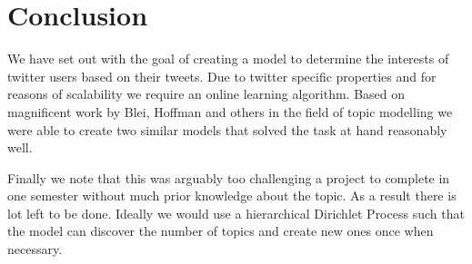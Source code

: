 \section{Conclusion}
We have set out with the goal of creating a model to determine the interests of twitter users based on their tweets. Due to twitter specific properties and for reasons of scalability we require an online learning algorithm. Based on magnificent work by Blei, Hoffman and others in the field of topic modelling we were able to create two similar models that solved the task at hand reasonably well.

Finally we note that this was arguably too challenging a project to complete in one semester without much prior knowledge about the topic. As a result there is lot left to be done. Ideally we would use a hierarchical Dirichlet Process such that the model can discover the number of topics and create new ones once when necessary.